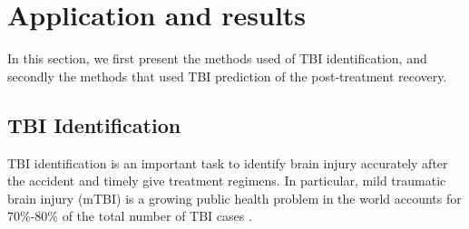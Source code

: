 \documentclass[runningheads]{llncs}
\def\jm#1{\textcolor{purple}{#1}}
\begin{document}

\section{Application and results}
In this section, we first present the methods used of TBI identification, and secondly the methods that used TBI prediction of the post-treatment recovery.

\subsection{TBI Identification}
TBI identification is an  important task to identify brain injury accurately after the accident and timely give treatment regimens. In particular, mild traumatic brain injury (mTBI) is a growing public health problem in the world accounts for 70\%-80\% of the total number of TBI cases \cite{dashnaw2012overview}.
\end{document}
